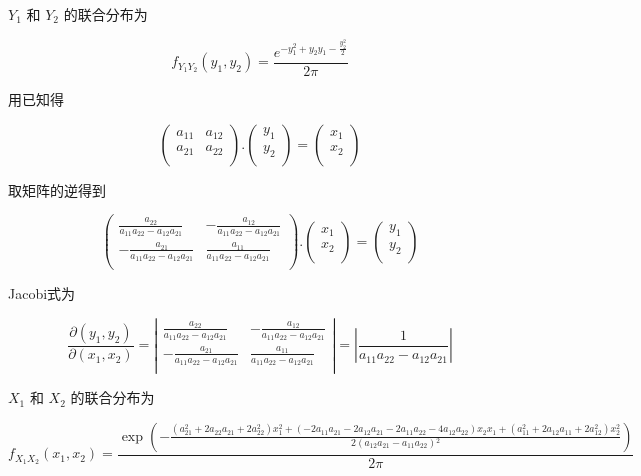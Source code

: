 \documentclass[]{article}
\begin{document}
\(Y_1\) 和 \(Y_2\) 的联合分布为

\[f_{Y_1Y_2}(y_1,y_2)=\frac{e^{-y_1^2+y_2 y_1-\frac{y_2^2}{2}}}{2 \pi }\]

用已知得

\[\left(
\begin{array}{cc}
 a_{11} & a_{12} \\
 a_{21} & a_{22} \\
\end{array}
\right).\left(
\begin{array}{c}
 y_1 \\
 y_2 \\
\end{array}
\right)=\left(
\begin{array}{c}
 x_1 \\
 x_2 \\
\end{array}
\right)\]

取矩阵的逆得到

\[\left(
\begin{array}{cc}
 \frac{a_{22}}{a_{11} a_{22}-a_{12} a_{21}} & -\frac{a_{12}}{a_{11} a_{22}-a_{12} a_{21}} \\
 -\frac{a_{21}}{a_{11} a_{22}-a_{12} a_{21}} & \frac{a_{11}}{a_{11} a_{22}-a_{12} a_{21}} \\
\end{array}
\right).\left(
\begin{array}{c}
 x_1 \\
 x_2 \\
\end{array}
\right)=\left(
\begin{array}{c}
 y_1 \\
 y_2 \\
\end{array}
\right)\]

Jacobi式为

\[\frac{\partial(y_1, y_2)}{\partial(x_1, x_2)}=\left|
\begin{array}{cc}
 \frac{a_{22}}{a_{11} a_{22}-a_{12} a_{21}} & -\frac{a_{12}}{a_{11} a_{22}-a_{12} a_{21}} \\
 -\frac{a_{21}}{a_{11} a_{22}-a_{12} a_{21}} & \frac{a_{11}}{a_{11} a_{22}-a_{12} a_{21}} \\
\end{array}
\right|=\left|\frac{1}{a_{11} a_{22}-a_{12} a_{21}}\right|\]

\(X_1\) 和 \(X_2\) 的联合分布为

\[f_{X_1X_2}(x_1,x_2)=\frac{\exp \left(-\frac{\left(a_{21}^2+2 a_{22} a_{21}+2 a_{22}^2\right) x_1^2+\left(-2 a_{11} a_{21}-2 a_{12} a_{21}-2 a_{11} a_{22}-4 a_{12} a_{22}\right) x_2 x_1+\left(a_{11}^2+2 a_{12} a_{11}+2 a_{12}^2\right) x_2^2}{2 \left(a_{12} a_{21}-a_{11} a_{22}\right){}^2}\right)}{2 \pi }\]
\end{document}
